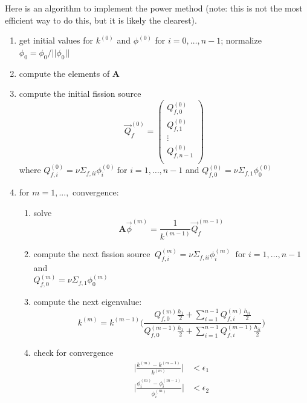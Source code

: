 \documentclass[12pt]{article}
\newcommand{\ve}[1]{\ensuremath{\mathbf{#1}}}
\begin{document}
Here is an algorithm to implement the power method (note: this is not the most efficient way to do this, but it is likely the clearest).
%
\begin{enumerate}
\item get initial values for $k^{(0)}$ and $\phi^{(0)}$ for $i = 0, \dots, n-1$; normalize $\phi_0 = \phi_0 / ||\phi_0||$

\item compute the elements of $\ve{A}$

\item compute the initial fission source
\[\vec{Q}_{f}^{(0)} = \begin{pmatrix}
Q_{f,0}^{(0)} \\ Q_{f,1}^{(0)} \\ \vdots \\ Q_{f,n-1}^{(0)} \\
\end{pmatrix}\]
%
where $Q_{f,i}^{(0)} = \nu\Sigma_{f,ii}\phi_i^{(0)} \: \text{for } i = 1, \dots, n-1$ and $Q_{f,0}^{(0)} = \nu\Sigma_{f,1}\phi_0^{(0)}$

\item for $m = 1, ...,$ convergence:
\begin{enumerate}
\item solve
\[\ve{A} \vec{\phi}^{(m)} = \frac{1}{k^{(m-1)}}\vec{Q}_{f}^{(m-1)}\]

\item compute the next fission source $\:Q_{f,i}^{(m)} = \nu\Sigma_{f,ii}\phi_i^{(m)} \: \text{ for } i = 1, \dots, n-1$ and\\ $Q_{f,0}^{(m)} = \nu\Sigma_{f,1}\phi_0^{(m)}$

\item compute the next eigenvalue:
\[k^{(m)} = k^{(m-1)}\Biggl(\frac{Q_{f,0}^{(m)} \frac{h_1}{2} + \sum_{i=1}^{n-1} Q_{f,i}^{(m)} \frac{h_{ii}}{2}}
{Q_{f,0}^{(m-1)} \frac{h_1}{2} + \sum_{i=1}^{n-1} Q_{f,i}^{(m-1)} \frac{h_{ii}}{2}}\Biggr)\]

\item check for convergence
\begin{align}
\bigg|\frac{k^{(m)} - k^{(m-1)}}{k^{(m)}}\bigg| &< \epsilon_1 \nonumber \\
\bigg|\frac{\phi_i^{(m)} - \phi_i^{(m-1)}}{\phi_i^{(m)}}\bigg| &< \epsilon_2 \nonumber
\end{align}

\end{enumerate}
\end{enumerate}

%
% 
\end{document}
